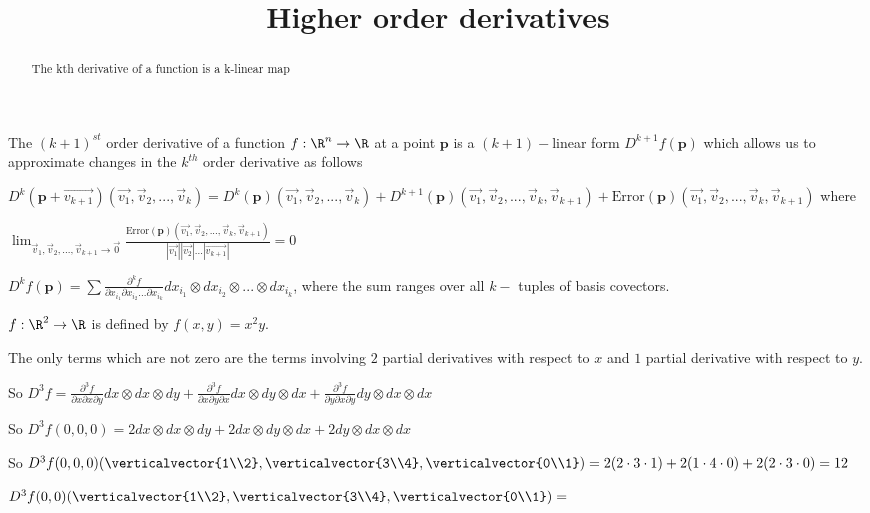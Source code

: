 \documentclass{ximera}
\title{Higher order derivatives}
\begin{document}
\begin{abstract}
	The kth derivative of a function is a k-linear map
\end{abstract}

The $(k+1)^{st}$ order derivative of a function $f: \R^n \to \R$  at a point $\mathbf{p}$ is a $(k+1)-$linear form  $D^{k+1} f(\mathbf{p})$ 
which allows us to approximate changes in the $k^{th}$ order derivative as follows
	
\begin{definition}
	$D^k(\mathbf{p} + \vec{v_{k+1}})(\vec{v_1},\vec{v}_2,...,\vec{v}_k)  = 
	D^k(\mathbf{p})(\vec{v_1},\vec{v}_2,...,\vec{v}_k) + D^{k+1}(\mathbf{p})(\vec{v_1},\vec{v}_2,...,\vec{v}_k,\vec{v}_{k+1})+ 
	\textrm{Error}(\mathbf{p})(\vec{v_1},\vec{v}_2,...,\vec{v}_k,\vec{v}_{k+1})$ where 
	
	\(
		\displaystyle\lim_{\vec{v}_1,\vec{v}_2,...,\vec{v}_{k+1} \to \vec{0} } 
		\frac{\textrm{Error}(\mathbf{p})(\vec{v_1},\vec{v}_2,...,\vec{v}_k,\vec{v}_{k+1})}{|\vec{v_1}||\vec{v_2}|...|\vec{v_{k+1}}|} = 0
	\)
\end{definition}

\begin{theorem}
	$D^kf(\mathbf{p}) = \sum \frac{\partial^kf}{\partial x_{i_1} \partial x_{i_2}... \partial x_{i_k}} dx_{i_1} \otimes dx_{i_2} \otimes ... \otimes dx_{i_k}$, where the sum ranges 
	over all $k-$ tuples of basis covectors.
\end{theorem}

\begin{question}
	$f:\R^2 \to \R$ is defined by $f(x,y) = x^2y$.  
	\begin{solution}
	\begin{hint}
		The only terms which are not zero are the terms involving $2$ partial derivatives with respect to $x$ and $1$ partial derivative with respect to $y$.
	\end{hint}
	\begin{hint}
		So $D^3f = \frac{\partial ^3 f}{\partial x \partial x \partial y} dx \otimes dx \otimes dy+ \frac{\partial ^3 f}{\partial x \partial y \partial x} dx \otimes dy \otimes dx+ \frac{\partial ^3 f}{\partial y \partial x \partial y} dy \otimes dx \otimes dx$
	\end{hint}
	\begin{hint}
		So $D^3f(0,0,0) = 2 dx\otimes dx \otimes dy+ 2 dx\otimes dy \otimes dx+2 dy\otimes dx \otimes dx$
	\end{hint}
	\begin{hint}
		So $D^3f(0,0,0)(\verticalvector{1\\2},\verticalvector{3\\4},\verticalvector{0\\1}) =2( 2 \cdot 3 \cdot 1)+2( 1 \cdot 4 \cdot 0)+2(2 \cdot 3 \cdot 0) = 12$
	\end{hint}
	$D^3f(0,0)(\verticalvector{1\\2},\verticalvector{3\\4},\verticalvector{0\\1})=$
	\end{solution}
\end{question}
\end{document}
